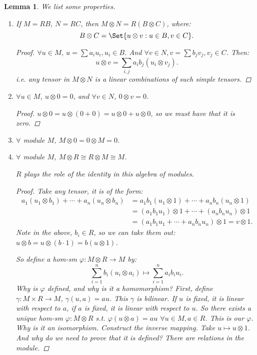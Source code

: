 \documentclass[9pt,reqno,twoside]{amsbook}
\theoremstyle{plain}
\numberwithin{section}{chapter}
\numberwithin{equation}{chapter}
\newtheorem{lem}[theorem]{Lemma}
\theoremstyle{definition}
\theoremstyle{remark}
\theoremstyle{plain}
\newcommand{\bee}{\begin{equation}\begin{aligned}}
\newcommand{\eee}{\end{aligned}\end{equation}}
\newcommand{\ten}{\otimes} %
\newcommand{\tens}{\otimes}
\renewcommand{\phi}{\varphi}
\begin{document}
\begin{lem}
We list some properties. 
\begin{enumerate}
\item If $M = RB$, $N = RC$, then $M \otimes N = R(B \otimes C)$, where: 
$$B \otimes C = \Set{u\otimes v:u \in B,v \in C}.
$$ 
\begin{proof}
$\forall u \in M$, $u = \sum a_iu_i,u_i \in B$. And $\forall v \in N, v = \sum b_jv_j,v_j \in C$. Then:
$$
u \otimes v = \sum_{i,j}a_ib_j(u_i \otimes v_j).
$$
i.e. any tensor in $M \otimes N$ is a linear combinations of such simple tensors. 
\end{proof}
\item $\forall u \in M$, $u \otimes 0 = 0$, and $\forall v \in N$, $0 \otimes v = 0$. 

\begin{proof}
$u \otimes 0 = u \otimes (0 + 0) = u \otimes 0 + u \otimes 0$, so we must have that it is zero. 
\end{proof}

\item $\forall$ module $M$, $M \otimes 0 = 0 \otimes M = 0$. 

\item $\forall$ module $M$, $M \otimes R \cong R \otimes M \cong M$. 

$R$ plays the role of the identity in this algebra of modules. 

\begin{proof}
Take any tensor, it is of the form: 
\bee \label{eqn10.17}
a_1(u_1 \otimes b_1) + \cdots + a_n(u_n \otimes b_n) &= a_1b_1(u_1 \otimes 1) + \cdots + a_nb_n(u_n \otimes 1)\\
&= (a_1b_1u_1) \otimes 1 + \cdots + (a_nb_nu_n) \otimes 1\\
&= (a_1b_1u_1 + \cdots + a_nb_nu_n) \otimes 1 = v \otimes 1.
\eee
Note in the above, $b_i \in R$, so we can take them out: $u \otimes b = u \otimes (b \cdot 1) = b(u \otimes 1)$. 

So define a hom-sm $\phi:M \ten R \to M$ by: 
$$
\sum_{i = 1}^n b_i(u_i \ten a_i) \mapsto \sum_{i = 1}^n a_ib_iu_i.
$$
Why is $\phi$ defined, and why is it a homomorphism? First, define $\gamma: M \times R \to M$, $\gamma(u,a) = au$. This $\gamma$ is bilinear. If $u$ is fixed, it is linear with respect to $a$, if $a$ is fixed, it is linear with respect to $u$. So there exists a unique hom-sm $\phi: M \tens
R$ s.t. $\phi(u \tens a) = au$ $\forall u \in M,a \in R$. This is our $\phi$. Why is it an isomorphism. Construct the inverse mapping. Take $u \mapsto u \tens 1$. And why do we need to prove that it is defined? There are relations in the module. 


\end{proof}
\end{enumerate}
\end{lem}
\end{document}
